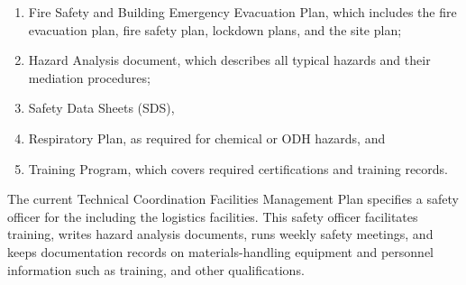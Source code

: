 \begin{enumerate}
\item	Fire Safety and Building Emergency Evacuation Plan, which includes the fire evacuation plan, fire safety plan,  lockdown plans, and the site plan;
\item	Hazard Analysis document, which describes all typical hazards and their mediation %
procedures; 
\item	%
Safety Data Sheets (SDS), 
\item	Respiratory Plan, as required for chemical or ODH hazards, and 
\item	Training Program, which covers required certifications and  training records.
\end{enumerate}

The current Technical Coordination Facilities Management Plan  specifies a safety officer for the  including the logistics facilities. This safety officer facilitates training, writes hazard analysis documents, runs weekly safety meetings, and keeps documentation records on materials-handling equipment and personnel information such as training,  and other qualifications. 





